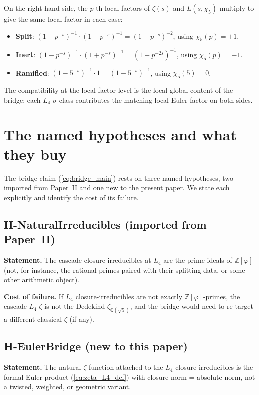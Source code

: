 \documentclass[11pt,a4paper]{article}
\theoremstyle{definition}
\theoremstyle{remark}
\begin{document}
On the right-hand side, the $p$-th local factors of $\zeta(s)$ and
$L(s, \chi_5)$ multiply to give the same local factor in each case:
\begin{itemize}
\item \textbf{Split}: $(1 - p^{-s})^{-1} \cdot (1 - p^{-s})^{-1}
      = (1 - p^{-s})^{-2}$, using $\chi_5(p) = +1$.
\item \textbf{Inert}: $(1 - p^{-s})^{-1} \cdot (1 + p^{-s})^{-1}
      = (1 - p^{-2s})^{-1}$, using $\chi_5(p) = -1$.
\item \textbf{Ramified}: $(1 - 5^{-s})^{-1} \cdot 1
      = (1 - 5^{-s})^{-1}$, using $\chi_5(5) = 0$.
\end{itemize}

The compatibility at the local-factor level is the local-global content
of the bridge: each $L_4$ $\sigma$-class contributes the matching
local Euler factor on both sides.

\section{The named hypotheses and what they buy}\label{sec:hypotheses}

The bridge claim (\ref{eq:bridge_main}) rests on three named hypotheses,
two imported from Paper~II and one new to the present paper. We state
each explicitly and identify the cost of its failure.

\subsection{H-NaturalIrreducibles (imported from Paper~II)}

\textbf{Statement.} The cascade closure-irreducibles at $L_4$ are the
prime ideals of $\mathbb{Z}[\varphi]$ (not, for instance, the rational
primes paired with their splitting data, or some other arithmetic
object).

\textbf{Cost of failure.} If $L_4$ closure-irreducibles are not exactly
$\mathbb{Z}[\varphi]$-primes, the cascade $L_4$ $\zeta$ is not the
Dedekind $\zeta_{\mathbb{Q}(\sqrt{5})}$, and the bridge would need to
re-target a different classical $\zeta$ (if any).

\subsection{H-EulerBridge (new to this paper)}

\textbf{Statement.} The natural $\zeta$-function attached to the $L_4$
closure-irreducibles is the formal Euler product (\ref{eq:zeta_L4_def})
with closure-norm = absolute norm, not a twisted, weighted, or
geometric variant.
\end{document}
